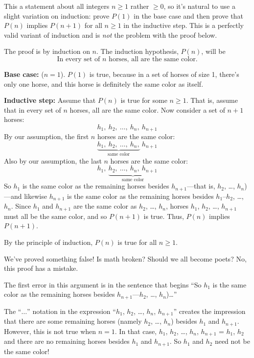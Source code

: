 This a statement about all integers $n \geq 1$ rather $\geq 0$, so it's
natural to use a slight variation on induction: prove $P(1)$ in the base
case and then prove that $P(n)$ implies $P(n+1)$ for all $n \geq 1$ in the
inductive step.  This is a perfectly valid variant of induction and is
\emph{not} the problem with the proof below.

\begin{falseproof}

The proof is by induction on $n$.  The induction hypothesis, $P(n)$, will be
\begin{equation}\label{horsehyp}
\text{In every set of $n$ horses, all are the same color.}
\end{equation}

\textbf{Base case:} ($n=1$).  $P(1)$ is true, because in a set of horses
of size 1, there's only one horse, and this horse is definitely the same
color as itself.

\textbf{Inductive step:} Assume that $P(n)$ is true for some $n \geq 1$.
That is, assume that in every set of $n$ horses, all are the same color.
Now consider a set of $n+1$ horses:
%
\[
h_1,\ h_2,\ \dots,\ h_n,\ h_{n+1}
\]
%
By our assumption, the first $n$ horses are the same color:
%
\[
\underbrace{h_1,\ h_2,\ \dots,\ h_n,}_{\text{same color}}\ h_{n+1}
\]
%
Also by our assumption, the last $n$ horses are the same color:
%
\[
h_1,\ \underbrace{h_2,\ \dots,\ h_n,\ h_{n+1}}_{\text{same color}}
\]
%
So $h_1$ is the same color as the remaining horses besides
$h_{n+1}$---that is, $h_2$, \ldots, $h_n$)---and likewise $h_{n+1}$ is
the same color as the remaining horses besides $h_1$--$h_2$, \ldots,
$h_n$.  Since $h_1$ and $h_{n+1}$ are the same color as $h_2$, \ldots,
$h_n$, horses $h_1$, $h_2$, \dots, $h_{n+1}$ must all be the same
color, and so $P(n+1)$ is true.  Thus, $P(n)$ implies $P(n+1)$.

By the principle of induction, $P(n)$ is true for all $n \geq 1$.
\end{falseproof}
We've proved something false!  Is math broken?  Should we all become
poets?  No, this proof has a mistake.

The first error in this argument is in the sentence that begins ``So
$h_1$ is the same color as the remaining horses besides
$h_{n+1}$---$h_2$, \dots, $h_n$)\dots''

The ``$\dots$'' notation in the expression ``$h_1$, $h_2$, \dots,
$h_n$, $h_{n+1}$'' creates the impression that there are some
remaining horses (namely $h_2$, \dots, $h_n$) besides $h_1$ and
$h_{n+1}$.  However, this is not true when $n = 1$.  In that case,
$h_1$, $h_2$, \dots, $h_n$, $h_{n+1}$ = $h_1$, $h_2$ and there are no
remaining horses besides $h_1$ and $h_{n+1}$.  So $h_1$ and $h_2$ need
not be the same color!

